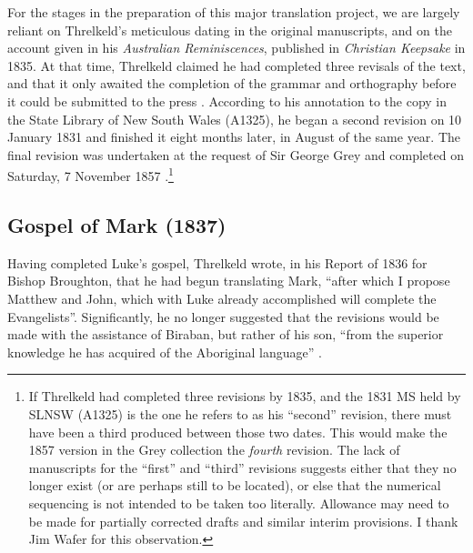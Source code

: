 {For the stages in the preparation of this major translation project, we are largely reliant on Threlkeld’s meticulous dating in the original manuscripts, and on the account given in his \textit{Australian Reminiscences}, published in \textit{Christian Keepsake} in 1835. At that time, Threlkeld claimed he had completed three revisals of the text, and that it only awaited the completion of the grammar and orthography before it could be submitted to the press \citep[42]{gunson_australian_1974a}. According to his annotation to the copy in the State Library of New South Wales (A1325), he began a second revision on 10 January 1831 and finished it eight months later, in August of the same year. The final revision was undertaken at the request of Sir George Grey and completed on Saturday, 7 November 1857 \citep[72, n. 4]{gunson_australian_1974a}.\footnote{If Threlkeld had completed three revisions by 1835, and the 1831 MS held by SLNSW (A1325) is the one he refers to as his “second” revision, there must have been a third produced between those two dates. This would make the 1857 version in the Grey collection the \textit{fourth} revision. The lack of manuscripts for the “first” and “third” revisions suggests either that they no longer exist (or are perhaps still to be located), or else that the numerical sequencing is not intended to be taken too literally. Allowance may need to be made for partially corrected drafts and similar interim provisions. I thank Jim Wafer for this observation.}

\subsection{Gospel of Mark (1837)}

Having completed Luke’s gospel, Threlkeld wrote, in his Report of 1836 for Bish\-op Broughton, that he had begun translating Mark, “after which I propose Matthew and John, which with Luke already accomplished will complete the Evangelists”. Significantly, he no longer suggested that the revisions would be made with the assistance of Biraban, but rather of his son, “from the superior knowledge he has acquired of the Aboriginal language” \citep[134]{gunson_australian_1974a}.

}

